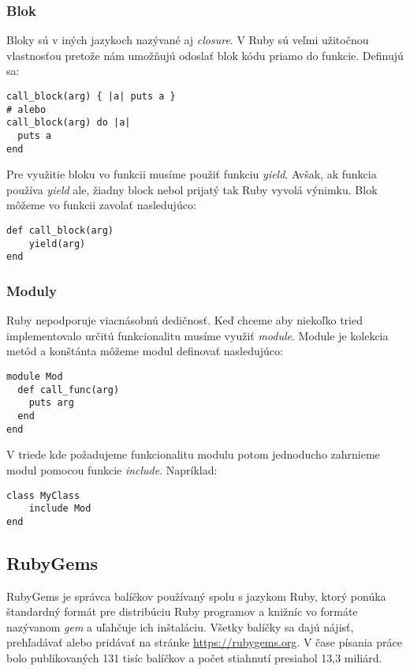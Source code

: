 \subsubsection{Blok}

Bloky sú v iných jazykoch nazývané aj \emph{closure}. V Ruby sú veľmi užitočnou vlastnosťou pretože nám umožňujú odoslať blok kódu priamo do funkcie. Definujú sa:

\begin{verbatim}
call_block(arg) { |a| puts a }
# alebo
call_block(arg) do |a|
  puts a
end
\end{verbatim}

Pre využitie bloku vo funkcii musíme použiť funkciu \emph{yield}. Avšak, ak funkcia používa \emph{yield} ale, žiadny block nebol prijatý tak Ruby vyvolá výnimku. Blok môžeme vo funkcii zavolať nasledujúco:

\begin{verbatim}
def call_block(arg)
    yield(arg)
end
\end{verbatim}

\subsubsection{Moduly}

Ruby nepodporuje viacnásobnú dedičnosť. Keď chceme aby niekoľko tried implementovalo určitú funkcionalitu musíme využiť \emph{module}. Module je kolekcia metód a konštánta môžeme modul definovať nasledujúco:

\begin{verbatim}
module Mod
  def call_func(arg)
    puts arg
  end
end
\end{verbatim}

V triede kde požadujeme funkcionalitu modulu potom jednoducho zahrnieme modul pomocou funkcie \emph{include}. Napríklad:

\begin{verbatim}
class MyClass
    include Mod
end
\end{verbatim}

\subsection{RubyGems}

RubyGems je správca balíčkov používaný spolu s jazykom Ruby, ktorý ponúka štandardný formát pre distribúciu Ruby programov a knižníc vo formáte nazývanom \emph{gem} a uľahčuje ich inštaláciu. Všetky balíčky sa dajú nájisť, prehľadávať alebo pridávať na stránke \url{https://rubygems.org}. V čase písania práce bolo publikovaných 131 tisíc balíčkov a počet stiahnutí presiahol 13,3 miliárd.

